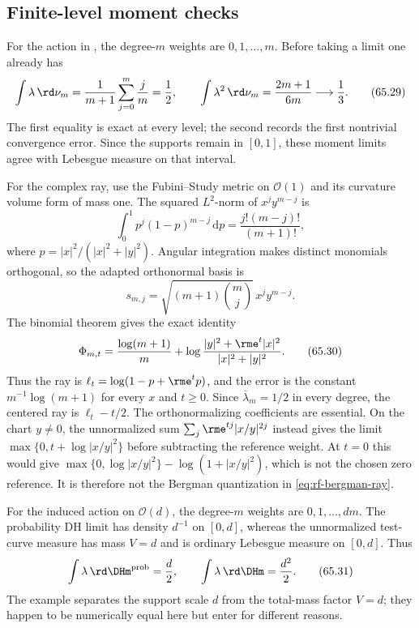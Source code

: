 \subsection{Finite-level moment checks}
\label{subsec:rf-finite-moments}

For the action in , the degree-$m$ weights are
$0,1,\ldots,m$.  Before taking a limit one already has
\[
 \int\lambda\,\rd\nu_m
       =\frac1{m+1}\sum_{j=0}^m\frac jm=\frac12,
 \qquad
 \int\lambda^2\,\rd\nu_m
       =\frac{2m+1}{6m}\longrightarrow\frac13.
\tag{65.29}\label{eq:rf-p1-finite-moments}
\]
The first equality is exact at every level; the second records the first
nontrivial convergence error.  Since the supports remain in $[0,1]$,
these moment limits agree with Lebesgue measure on that interval.

For the complex ray, use the Fubini--Study metric on $\mathcal O(1)$ and its curvature volume form of mass one. The squared $L^2$-norm of $x^j y^{m-j}$ is
\[
 \int_0^1p^j(1-p)^{m-j}\,\mathrm dp
      =\frac{j!(m-j)!}{(m+1)!},
\]
where $p=|x|^2/(|x|^2+|y|^2)$. Angular integration makes distinct monomials orthogonal, so the adapted orthonormal basis is
\[
                 s_{m,j}=\sqrt{(m+1)\binom mj}\,x^jy^{m-j}.
\]
The binomial theorem gives the exact identity
\[
 \Phi_{m,t}
   =\frac{\log(m+1)}m+
       \log\frac{|y|^2+\rme^t|x|^2}{|x|^2+|y|^2}.
\tag{65.30}\label{eq:rf-p1-log-sum-limit}
\]
Thus the ray is $\ell_t=\log(1-p+\rme^t p)$, and the error is the constant $m^{-1}\log(m+1)$ for every $x$ and $t\geq0$. Since $\overline\lambda_m=1/2$ in every degree, the centered ray is $\ell_t-t/2$. The orthonormalizing coefficients are essential. On the chart $y\ne0$, the unnormalized sum $\sum_j\rme^{tj}|x/y|^{2j}$ instead gives the limit $\max\{0,t+\log|x/y|^2\}$ before subtracting the reference weight. At $t=0$ this would give $\max\{0,\log|x/y|^2\}-\log(1+|x/y|^2)$, which is not the chosen zero reference. It is therefore not the Bergman quantization in \eqref{eq:rf-bergman-ray}.

For the induced action on $\mathcal O(d)$, the degree-$m$ weights are
$0,1,\ldots,dm$.  The probability DH limit has density $d^{-1}$ on
$[0,d]$, whereas the unnormalized test-curve measure has mass
$V=d$ and is ordinary Lebesgue measure on $[0,d]$.  Thus
\[
 \int\lambda\,\rd\DHm^{\mathrm{prob}}=\frac d2,
 \qquad
 \int\lambda\,\rd\DHm=\frac{d^2}{2}.
\tag{65.31}\label{eq:rf-od-mass-moment-check}
\]
The example separates the support scale $d$ from the total-mass factor
$V=d$; they happen to be numerically equal here but enter for different
reasons.

